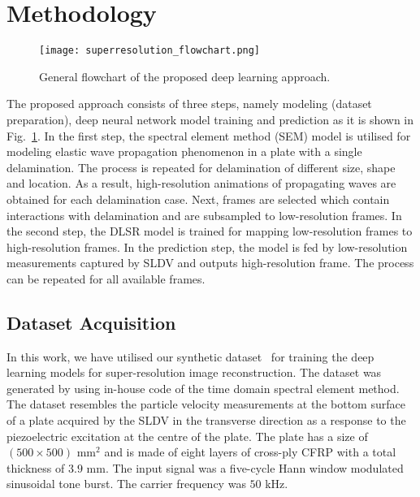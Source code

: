 \section{Methodology}

\begin{figure}[!ht]
	\begin{center}
		\texttt{[image: superresolution\_flowchart.png]}
	\end{center}
	\caption{General flowchart of the proposed deep learning approach.} 
	\label{fig:flowchart}
\end{figure}

The proposed approach consists of three steps, namely modeling (dataset preparation), deep neural network model training and prediction as it is shown in Fig.~\ref{fig:flowchart}. 
In the first step, the spectral element method (SEM) model is utilised for modeling elastic wave propagation phenomenon in a plate with a single delamination. 
The process is repeated for delamination of different size, shape and location. 
As a result, high-resolution animations of propagating waves are obtained for each delamination case. 
Next, frames are selected which contain interactions with delamination and are subsampled to low-resolution frames.
In the second step, the DLSR model is trained for mapping low-resolution frames to high-resolution frames. 
In the prediction step, the model is fed by low-resolution measurements captured by SLDV and outputs high-resolution frame. 
The process can be repeated for all available frames.

\subsection{Dataset Acquisition}
In this work, we have utilised our synthetic dataset~\cite{kudela_pawel_2021_5414555} for training the deep learning models for super-resolution image reconstruction.
The dataset was generated by using in-house code of the time domain spectral element method.
The dataset resembles the particle velocity measurements at the bottom surface of a plate acquired by the SLDV in the transverse direction as a response to the piezoelectric excitation at the centre of the plate.
The plate has a size of \( (500\times500)\) mm\(^2\) and is made of eight layers of cross-ply CFRP with a total thickness of \(3.9\) mm.
The input signal was a five-cycle Hann window modulated sinusoidal tone burst. The carrier frequency was \(50\) kHz.

